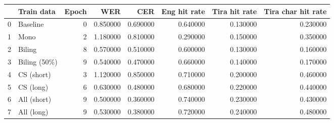 \begin{tabular}{llrrrrrr}
\toprule
 & Train data & Epoch & WER & CER & Eng hit rate & Tira hit rate & Tira char hit rate \\
\midrule
0 & Baseline & 0 & 0.850000 & 0.690000 & 0.640000 & 0.130000 & 0.230000 \\
1 & Mono & 2 & 1.180000 & 0.810000 & 0.290000 & 0.150000 & 0.350000 \\
2 & Biling & 8 & 0.570000 & 0.510000 & 0.600000 & 0.130000 & 0.160000 \\
3 & Biling (50\%) & 9 & 0.540000 & 0.470000 & 0.660000 & 0.140000 & 0.170000 \\
4 & CS (short) & 3 & 1.120000 & 0.850000 & 0.710000 & 0.200000 & 0.460000 \\
5 & CS (long) & 6 & 0.630000 & 0.480000 & 0.680000 & 0.220000 & 0.440000 \\
6 & All (short) & 9 & 0.500000 & 0.360000 & 0.740000 & 0.230000 & 0.430000 \\
7 & All (long) & 9 & 0.530000 & 0.380000 & 0.720000 & 0.240000 & 0.480000 \\
\bottomrule
\end{tabular}
